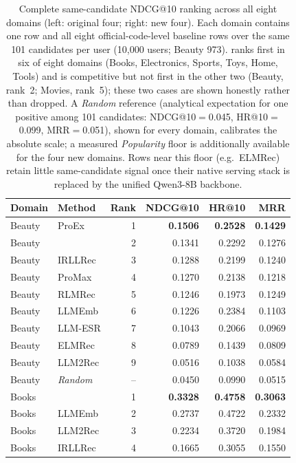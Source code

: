 \begin{table}[t]
\centering
\scriptsize
\setlength{\tabcolsep}{3pt}
\caption{Complete same-candidate NDCG@10 ranking across all eight domains (left:
original four; right: new four). Each domain contains one \method{} row and all
eight official-code-level baseline rows over the same 101 candidates per user
(10,000 users; Beauty 973). \method{} ranks first in six of eight domains
(Books, Electronics, Sports, Toys, Home, Tools) and is competitive but not first
in the other two (Beauty, rank~2; Movies, rank~5); these two cases are shown
honestly rather than dropped. A \textit{Random} reference (analytical
expectation for one positive among 101 candidates: NDCG@10$=$0.045,
HR@10$=$0.099, MRR$=$0.051), shown for every domain, calibrates the absolute
scale; a measured \textit{Popularity} floor is additionally available for the
four new domains. Rows near this floor (e.g.\ ELMRec) retain little
same-candidate signal once their native serving stack is replaced by the unified
Qwen3-8B backbone.}
\label{tab:full_official_ndcg10}
\begin{minipage}[t]{0.49\textwidth}
\centering
\begin{tabular}{llrrrr}
\toprule
Domain & Method & Rank & NDCG@10 & HR@10 & MRR \\
\midrule
Beauty & ProEx & 1 & \textbf{0.1506} & \textbf{0.2528} & \textbf{0.1429} \\
Beauty & \method{} & 2 & 0.1341 & 0.2292 & 0.1276 \\
Beauty & IRLLRec & 3 & 0.1288 & 0.2199 & 0.1240 \\
Beauty & ProMax & 4 & 0.1270 & 0.2138 & 0.1218 \\
Beauty & RLMRec & 5 & 0.1246 & 0.1973 & 0.1249 \\
Beauty & LLMEmb & 6 & 0.1226 & 0.2384 & 0.1103 \\
Beauty & LLM-ESR & 7 & 0.1043 & 0.2066 & 0.0969 \\
Beauty & ELMRec & 8 & 0.0789 & 0.1439 & 0.0809 \\
Beauty & LLM2Rec & 9 & 0.0516 & 0.1038 & 0.0584 \\
Beauty & \textit{Random} & -- & 0.0450 & 0.0990 & 0.0515 \\
\midrule
Books & \method{} & 1 & \textbf{0.3328} & \textbf{0.4758} & \textbf{0.3063} \\
Books & LLMEmb & 2 & 0.2737 & 0.4722 & 0.2332 \\
Books & LLM2Rec & 3 & 0.2234 & 0.3720 & 0.1984 \\
Books & IRLLRec & 4 & 0.1665 & 0.3055 & 0.1550 \\

\end{tabular}
\end{minipage}
\end{table}
